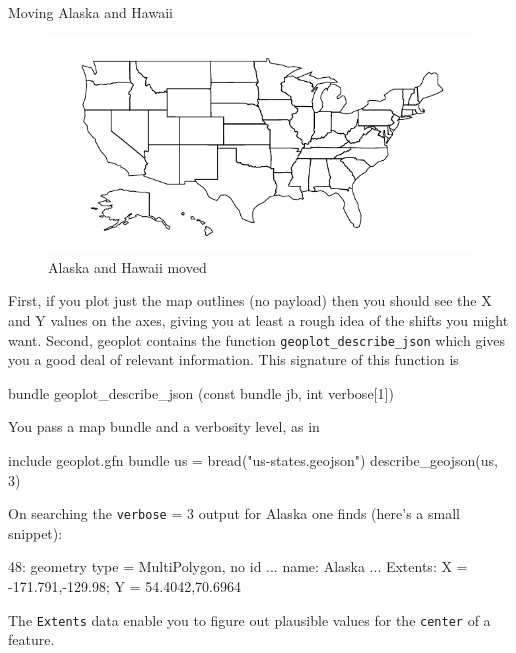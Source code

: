 \documentclass{article}
\begin{document}
\begin{script}[p]
  \caption{Moving Alaska and Hawaii}
  \label{tab:translate}
\end{script}

\begin{figure}[p]
  \centering
  \includegraphics{usmod.pdf}
  \caption{Alaska and Hawaii moved}
  \label{fig:usmod}
\end{figure}

First, if you plot just the map outlines (no payload) then you should
see the X and Y values on the axes, giving you at least a rough idea
of the shifts you might want. Second, \textsf{geoplot} contains the
function \texttt{geoplot\_describe\_json} which gives you a good deal
of relevant information. This signature of this function is
\begin{code}
bundle geoplot_describe_json (const bundle jb, int verbose[1])
\end{code}
You pass a map bundle and a verbosity level, as in
\begin{code}
include geoplot.gfn
bundle us = bread("us-states.geojson")
describe_geojson(us, 3)
\end{code}
On searching the \texttt{verbose} = 3 output for Alaska one finds
(here's a small snippet):
\begin{code}
  48: geometry type = MultiPolygon, no id
        ...
        name: Alaska
        ...
        Extents: X = {-171.791,-129.98}; Y = {54.4042,70.6964}
\end{code}
The \texttt{Extents} data enable you to figure out plausible
values for the \texttt{center} of a feature.
\end{document}
